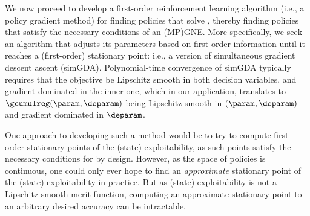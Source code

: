 
We now proceed to develop a first-order reinforcement learning algorithm (i.e., a policy gradient method) for finding policies that solve , thereby finding policies that satisfy the necessary conditions of an (MP)GNE.
More specifically, we seek an algorithm that adjusts its parameters based on first-order information until it reaches a (first-order) stationary point: i.e., a version of simultaneous gradient descent ascent (simGDA). 
Polynomial-time convergence of simGDA typically  requires that the objective be Lipschitz smooth in both decision variables, and gradient dominated in the inner one, which in our application, translates to
$\gcumulreg (\param, \deparam)$ being Lipschitz smooth in $(\param, \deparam)$ and gradient dominated in $\deparam$.



One approach to developing such a method would be to try to compute first-order stationary points of the (state) exploitability, as such points satisfy the necessary conditions for \MPGNE{} by design.
However, as the space of policies is continuous, one could only ever hope to find an \emph{approximate\/} stationary point of the (state) exploitability in practice.
But as (state) exploitability is not a Lipschitz-smooth merit function, computing an approximate stationary point to an arbitrary desired accuracy can be intractable.%

